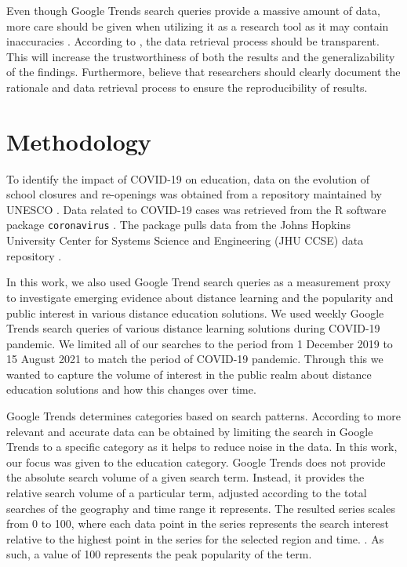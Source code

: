 \documentclass[11pt,a4paper,]{article}
\begin{document}
Even though Google Trends search queries provide a massive amount of data, more care should be given when utilizing it as a research tool as it may contain inaccuracies \autocite{carneiro2009google}. According to \textcite{nuti2014use}, the data retrieval process should be transparent. This will increase the trustworthiness of both the results and the generalizability of the findings. Furthermore, \textcite{nuti2014use} believe that researchers should clearly document the rationale and data retrieval process to ensure the reproducibility of results.

\hypertarget{methodology}{%
\section{Methodology}\label{methodology}}

To identify the impact of COVID-19 on education, data on the evolution of school closures and re-openings was obtained from a repository maintained by UNESCO \autocite{unesco2020covid}. Data related to COVID-19 cases was retrieved from the R software \autocite{rsoftware} package \texttt{coronavirus} \autocite{coronavirusr}. The package pulls data from the Johns
Hopkins University Center for Systems Science and Engineering (JHU CCSE) data repository \autocite{dong2020interactive}.

In this work, we also used Google Trend search queries as a measurement proxy to investigate emerging evidence about distance learning and the popularity and public interest in various distance education solutions. We used weekly Google Trends search queries of various distance learning solutions during COVID-19 pandemic. We limited all of our searches to the period from 1 December 2019 to 15 August 2021 to match the period of COVID-19 pandemic. Through this we wanted to capture the volume of interest in the public realm about distance education solutions and how this changes over time.

Google Trends determines categories based on search patterns. According to \textcite{vaughan2014web} more relevant and accurate data can be obtained by limiting the search in Google Trends to a specific category as it helps to reduce noise in the data. In this work, our focus was given to the education category. Google Trends does not provide the absolute search volume of a given search term. Instead, it provides the relative search volume of a particular term, adjusted according to the total searches of the geography and time range it represents. The resulted series scales from 0 to 100, where each data point in the series represents the search interest relative to the highest point in the series for the selected region and time. \autocite{alicino2015assessing,vaughan2014web}. As such, a value of 100 represents the peak popularity of the term.
\end{document}
